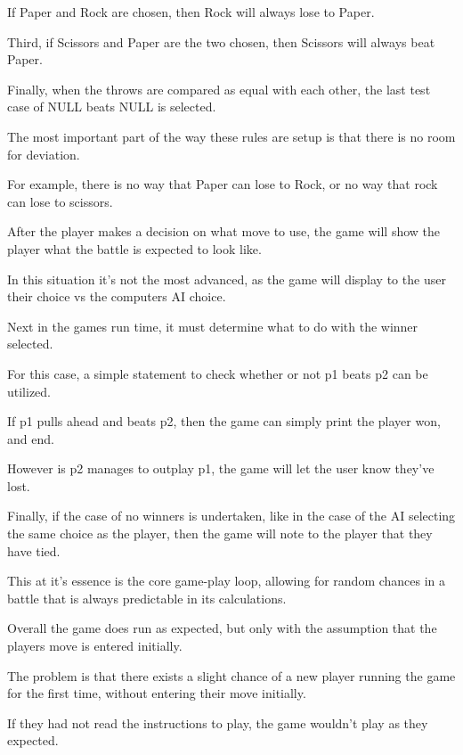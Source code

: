 \documentclass{article}
\begin{document}
\medskip\noindent
If Paper and Rock are chosen, then Rock will always lose to Paper.

\medskip\noindent
Third, if Scissors and Paper are the two chosen, then Scissors will always beat Paper.

\medskip\noindent
Finally, when the throws are compared as equal with each other, the last test case of NULL beats NULL is selected. 

\medskip\noindent
The most important part of the way these rules are setup is that there is no room for deviation.

\medskip\noindent
For example, there is no way that Paper can lose to Rock, or no way that rock can lose to scissors.

\medskip\noindent
After the player makes a decision on what move to use, the game will show the player what the battle is expected to look like.

\medskip\noindent
In this situation it's not the most advanced, as the game will display to the user their choice vs the computers AI choice.

\medskip\noindent
Next in the games run time, it must determine what to do with the winner selected.

\medskip\noindent
For this case, a simple statement to check whether or not p1 beats p2 can be utilized.

\medskip\noindent
If p1 pulls ahead and beats p2, then the game can simply print the player won, and end.

\medskip\noindent
However is p2 manages to outplay p1, the game will let the user know they've lost.

\medskip\noindent
Finally, if the case of no winners is undertaken, like in the case of the AI selecting the same choice as the player, then the game will note to the player that they have tied.

\medskip\noindent
This at it's essence is the core game-play loop, allowing for random chances in a battle that is always predictable in its calculations.

\medskip\noindent
Overall the game does run as expected, but only with the assumption that the players move is entered initially.

\medskip\noindent
The problem is that there exists a slight chance of a new player running the game for the first time, without entering their move initially.

\medskip\noindent
If they had not read the instructions to play, the game wouldn't play as they expected.
\end{document}
